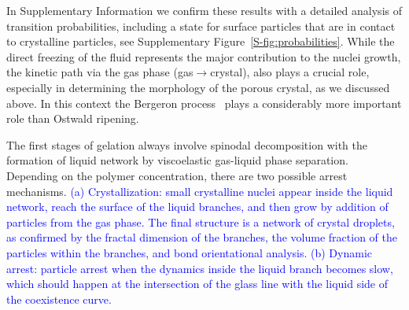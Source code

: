 \documentclass[preprint,amsmath,amssymb,superscriptaddress]{revtex4-1}
\begin{document}
In Supplementary Information we confirm these results with a detailed analysis of transition probabilities, including a state for surface particles that are in contact 
to crystalline particles, see Supplementary Figure~\ref{S-fig:probabilities}.
While the direct freezing of the fluid represents the major contribution to the nuclei growth, the kinetic path via the gas phase (gas$\rightarrow$crystal), also plays a crucial role,
especially in determining the morphology of the porous crystal, as we discussed above. In this context the Bergeron process~\cite{glickman2000glossary,morrison2012resilience}
plays a considerably more important role than Ostwald ripening.

% 

The first stages of gelation always involve spinodal decomposition with the formation
of liquid network by viscoelastic gas-liquid phase separation. 
Depending on the polymer concentration, there are two possible arrest mechanisms. 
\textcolor{blue}{(a) Crystallization: small crystalline nuclei appear inside the liquid network, reach the surface 
 of the liquid branches, and then grow by addition of particles from the gas phase. The final structure is a network of crystal droplets,
 as confirmed by the fractal dimension of the branches, the volume fraction of the particles within the branches, and bond orientational analysis. 
(b) Dynamic arrest: particle arrest when the dynamics inside the liquid branch becomes slow, which should happen at the intersection of the  glass line with the liquid side of the coexistence curve.}
\end{document}
